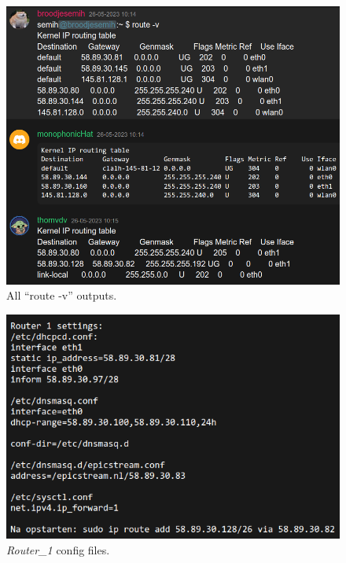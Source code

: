 \documentclass[a4paper,1pt]{article}
\begin{document}
\begin{figure}[H]
	\centering
	\includegraphics[width=\textwidth]{routetable.png}
	\caption{All ``route -v'' outputs.}
	\label{fig:ferhsat2}
\end{figure}


\begin{figure}[H]
	\centering
	\includegraphics[width=\textwidth]{thomconf.png}
	\caption{\textit{Router\_1 } config files.}
	\label{fig:ssdsad}
\end{figure}


\pagebreak
\end{document}
